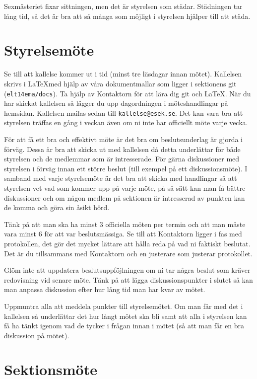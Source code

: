 \documentclass[10pt]{article}
\begin{document}
Sexmästeriet fixar sittningen, men det är styrelsen som städar. Städningen tar lång tid, så det är bra att så många som möjligt i styrelsen hjälper till att städa.

\section{Styrelsemöte}

Se till att kallelse kommer ut i tid (minst tre läsdagar innan mötet).
Kallelsen skrivs i \LaTeX med hjälp av våra dokumentmallar som ligger i sektionens git (\texttt{elt14ema/docs}). Ta hjälp av Kontaktorn för att lära dig git och \LaTeX. När du har skickat kallelsen så lägger du upp dagordningen i möteshandlingar på hemsidan. Kallelsen mailas sedan till \texttt{kallelse@esek.se}. Det kan vara bra att styrelsen träffas en gång i veckan även om ni inte har officiellt möte varje vecka.

För att få ett bra och effektivt möte är det bra om beslutsunderlag är gjorda i förväg. Dessa är bra att skicka ut med kallelsen då detta underlättar för både styrelsen och de medlemmar som är intresserade. För gärna diskussioner med styrelsen i förväg innan ett större beslut (till exempel på ett diskussionsmöte). I samband med varje styrelsemöte är det bra att skicka med handlingar så att styrelsen vet vad som kommer upp på varje möte, på så sätt kan man få bättre diskussioner och om någon medlem på sektionen är intresserad av punkten kan de komma och göra sin åsikt hörd.

Tänk på att man ska ha minst 3 officiella möten per termin och att man måste vara minst 6 för att var beslutsmässiga. Se till att Kontaktorn ligger i fas med protokollen, det gör det mycket lättare att hålla reda på vad ni faktiskt beslutat. Det är du tillsammans med Kontaktorn och en justerare som justerar protokollet.

Glöm inte att uppdatera beslutsuppföjlningen om ni tar några beslut som kräver redovisning vid senare möte. Tänk på att lägga diskussionspunkter i slutet så kan man anpassa diskussion efter hur lång tid man har kvar av mötet.

Uppmuntra alla att meddela punkter till styrelsemötet. Om man får med det i kallelsen så underlättar det hur långt mötet ska bli samt att alla i styrelsen kan få ha tänkt igenom vad de tycker i frågan innan i mötet (så att man får en bra diskussion på mötet).

\section{Sektionsmöte}
\end{document}
